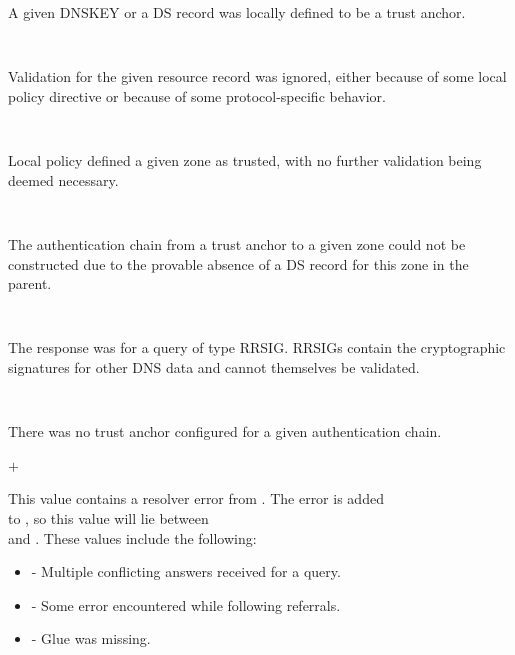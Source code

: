 \begin{description}
\begin{description}
\begin{description}
A given DNSKEY or a DS record was locally defined to be a trust anchor.

\item {}\verb" "

Validation for the given resource record was ignored, either because of some
local policy directive or because of some protocol-specific behavior.

\item {}\verb" "

Local policy defined a given zone as trusted, with no further validation being
deemed necessary.

\item {}\verb" "

The authentication chain from a trust anchor to a given zone could not be
constructed due to the provable absence of a DS record for this zone in the
parent.

\item {}\verb" "

The response was for a query of type RRSIG.  RRSIGs contain the cryptographic
signatures for other DNS data and cannot themselves be validated.

\item {}\verb" "

There was no trust anchor configured for a given authentication chain.

\item {} $+$ \verb" "

This value contains a resolver error from .  The 
error is added \\
to , so this value will lie between \\
 and .
These values include the following:

\begin{itemize}

\item {} - Multiple conflicting answers received
for a query.

\item {} - Some error encountered while following
referrals.

\item {} - Glue was missing.


\end{itemize}
\end{description}
\end{description}
\end{description}

